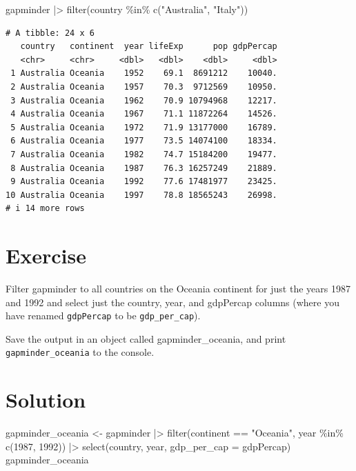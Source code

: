 \documentclass[
  letterpaper,
  DIV=11,
  numbers=noendperiod]{scrreprt}
\newenvironment{Shaded}{\begin{snugshade}}{\end{snugshade}}
\newcommand{\AttributeTok}[1]{\textcolor[rgb]{0.40,0.45,0.13}{#1}}
\newcommand{\DecValTok}[1]{\textcolor[rgb]{0.68,0.00,0.00}{#1}}
\newcommand{\FunctionTok}[1]{\textcolor[rgb]{0.28,0.35,0.67}{#1}}
\newcommand{\NormalTok}[1]{\textcolor[rgb]{0.00,0.23,0.31}{#1}}
\newcommand{\OtherTok}[1]{\textcolor[rgb]{0.00,0.23,0.31}{#1}}
\newcommand{\SpecialCharTok}[1]{\textcolor[rgb]{0.37,0.37,0.37}{#1}}
\newcommand{\StringTok}[1]{\textcolor[rgb]{0.13,0.47,0.30}{#1}}
\begin{document}
\begin{Shaded}
\begin{Highlighting}[]
\NormalTok{gapminder }\SpecialCharTok{|\textgreater{}} \FunctionTok{filter}\NormalTok{(country }\SpecialCharTok{\%in\%} \FunctionTok{c}\NormalTok{(}\StringTok{"Australia"}\NormalTok{, }\StringTok{"Italy"}\NormalTok{))}
\end{Highlighting}
\end{Shaded}

\begin{verbatim}
# A tibble: 24 x 6
   country   continent  year lifeExp      pop gdpPercap
   <chr>     <chr>     <dbl>   <dbl>    <dbl>     <dbl>
 1 Australia Oceania    1952    69.1  8691212    10040.
 2 Australia Oceania    1957    70.3  9712569    10950.
 3 Australia Oceania    1962    70.9 10794968    12217.
 4 Australia Oceania    1967    71.1 11872264    14526.
 5 Australia Oceania    1972    71.9 13177000    16789.
 6 Australia Oceania    1977    73.5 14074100    18334.
 7 Australia Oceania    1982    74.7 15184200    19477.
 8 Australia Oceania    1987    76.3 16257249    21889.
 9 Australia Oceania    1992    77.6 17481977    23425.
10 Australia Oceania    1997    78.8 18565243    26998.
# i 14 more rows
\end{verbatim}

\section{Exercise}

Filter gapminder to all countries on the Oceania continent for just the
years 1987 and 1992 and select just the country, year, and gdpPercap
columns (where you have renamed \texttt{gdpPercap} to be
\texttt{gdp\_per\_cap}).

Save the output in an object called gapminder\_oceania, and print
\texttt{gapminder\_oceania} to the console.

\section{Solution}

\begin{Shaded}
\begin{Highlighting}[]
\NormalTok{gapminder\_oceania }\OtherTok{\textless{}{-}}\NormalTok{ gapminder }\SpecialCharTok{|\textgreater{}} 
  \FunctionTok{filter}\NormalTok{(continent }\SpecialCharTok{==} \StringTok{"Oceania"}\NormalTok{, year }\SpecialCharTok{\%in\%} \FunctionTok{c}\NormalTok{(}\DecValTok{1987}\NormalTok{, }\DecValTok{1992}\NormalTok{)) }\SpecialCharTok{|\textgreater{}}
  \FunctionTok{select}\NormalTok{(country, year, }\AttributeTok{gdp\_per\_cap =}\NormalTok{ gdpPercap)}
\NormalTok{gapminder\_oceania}
\end{Highlighting}
\end{Shaded}
\end{document}
